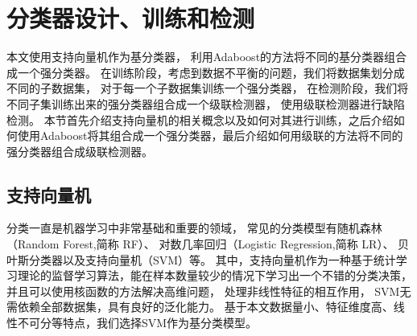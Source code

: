 \section{分类器设计、训练和检测}


本文使用支持向量机作为基分类器，
利用Adaboost的方法将不同的基分类器组合成一个强分类器。
在训练阶段，考虑到数据不平衡的问题，我们将数据集划分成不同的子数据集，
对于每一个子数据集训练一个强分类器，
在检测阶段，我们将不同子集训练出来的强分类器组合成一个级联检测器，
使用级联检测器进行缺陷检测。
本节首先介绍支持向量机的相关概念以及如何对其进行训练，之后介绍如何使用Adaboost将其组合成一个强分类器，最后介绍如何用级联的方法将不同的强分类器组合成级联检测器。

\subsection{支持向量机}
\label{subsection:svm}

分类一直是机器学习中非常基础和重要的领域，
常见的分类模型有随机森林\cite{breiman2001random}（Random Forest,简称 RF）、
对数几率回归\cite{周志华2016机器学习}（Logistic Regression,简称 LR）、
贝叶斯分类器以及支持向量机（SVM）等。
其中，支持向量机作为一种基于统计学习理论的监督学习算法，能在样本数量较少的情况下学习出一个不错的分类决策，
并且可以使用核函数的方法解决高维问题，
处理非线性特征的相互作用，
SVM无需依赖全部数据集，具有良好的泛化能力。
基于本文数据量小、特征维度高、线性不可分等特点，我们选择SVM作为基分类模型。

